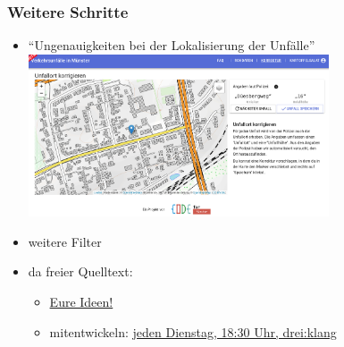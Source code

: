 \documentclass{beamer}
\begin{document}
\begin{frame}
  \frametitle{Weitere Schritte}  
  \centering  
  
  \begin{itemize}
    \item "`Ungenauigkeiten bei der Lokalisierung der Unfälle"' \cite[S.~38]{Baier2018}
    \includegraphics[width=0.7\textwidth]{img/editor-screenshot.png}
    \item weitere Filter
    \item da freier Quelltext:
    \begin{itemize}
      \item \href{https://github.com/codeformuenster/crashes-shiny/issues}{Eure Ideen!}
      \item mitentwickeln: \href{https://codeformuenster.org}{jeden Dienstag, 18:30 Uhr, drei:klang}
    \end{itemize}
  \end{itemize}
\end{frame}
\end{document}
